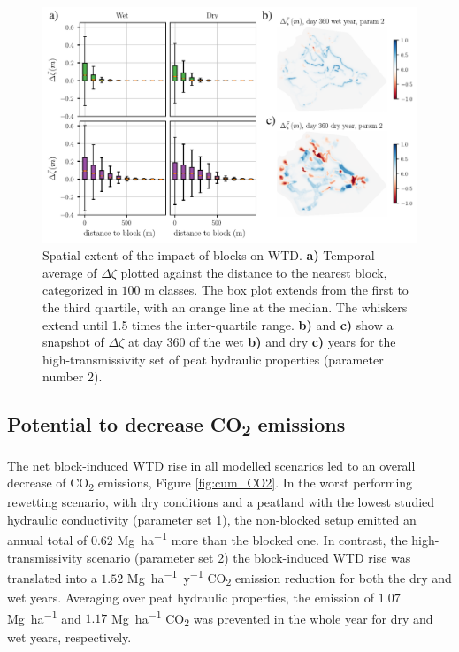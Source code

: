 \documentclass[bg, manuscript]{copernicus}
\begin{document}
\begin{figure}[t]
\includegraphics[width=12 cm]{figs/rasters_and_distance_to_blocks.pdf}
\caption{Spatial extent of the impact of blocks  on WTD. \textbf{a)} Temporal average of $\Delta \zeta$ plotted against the distance to the nearest block, categorized in $100$ \unit{m} classes. The box plot extends from the first to the third quartile, with an orange line at the median. The whiskers extend until 1.5 times the inter-quartile range. \textbf{b)} and \textbf{c)} show a snapshot of $\Delta \zeta$ at day $360$ of the wet \textbf{b)} and dry \textbf{c)} years for the high-transmissivity set of peat hydraulic properties (parameter number 2).}
\label{fig:spatial_extent_of_block_effect}
\end{figure}   


\subsection{Potential to decrease CO\textsubscript{2} emissions}
The net block-induced WTD rise in all modelled scenarios led to an overall decrease of CO\textsubscript{2} emissions, Figure \ref{fig:cum_CO2}.
In the worst performing rewetting scenario, with dry conditions and a peatland with the lowest studied hydraulic conductivity (parameter set 1), the non-blocked setup emitted an annual total of $0.62$ \unit{Mg ha^{-1}} more than the blocked one.
In contrast, the high-transmissivity scenario (parameter set 2) the block-induced WTD rise was translated into a $1.52$ \unit{Mg ha^{-1} y^{-1}} CO\textsubscript{2} emission reduction for both the dry and wet years.
Averaging over peat hydraulic properties, the emission of $1.07$ \unit{Mg ha^{-1}} and $1.17$ \unit{Mg ha^{-1}} CO\textsubscript{2} was prevented in the whole year for dry and wet years, respectively.
\end{document}
